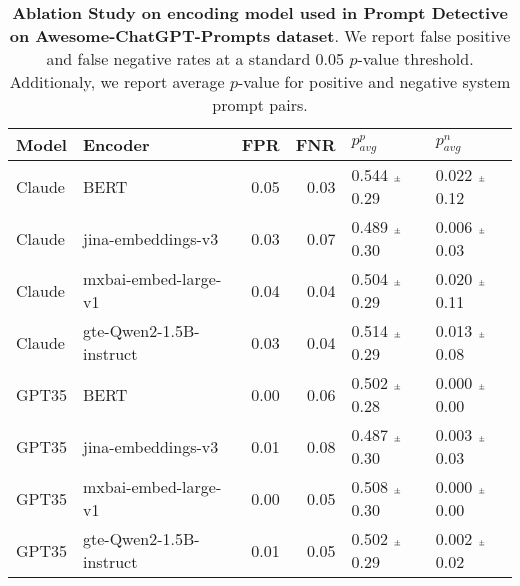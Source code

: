 \begin{table}[t!]
\caption{{\bf Ablation Study on encoding model used in Prompt Detective on Awesome-ChatGPT-Prompts dataset}. We report false positive and false negative rates at a standard 0.05 $p$-value threshold. Additionaly, we report average $p$-value for positive  and negative system prompt pairs.}
\label{tab: embeddings}
\centering
\setlength{\tabcolsep}{5pt}
\begin{tabular}{llrrll}
\toprule
Model & Encoder & FPR & FNR & $p_{avg}^{p}$ & $p_{avg}^{n}$ \\
\midrule
Claude & BERT & 0.05 & 0.03 & 0.544 $\scriptscriptstyle \pm \scriptstyle$ 0.29 & 0.022 $\scriptscriptstyle \pm \scriptstyle$ 0.12 \\
Claude & jina-embeddings-v3 & 0.03 & 0.07 & 0.489 $\scriptscriptstyle \pm \scriptstyle$ 0.30 & 0.006 $\scriptscriptstyle \pm \scriptstyle$ 0.03 \\
Claude & mxbai-embed-large-v1 & 0.04 & 0.04 & 0.504 $\scriptscriptstyle \pm \scriptstyle$ 0.29 & 0.020 $\scriptscriptstyle \pm \scriptstyle$ 0.11 \\
Claude & gte-Qwen2-1.5B-instruct & 0.03 & 0.04 & 0.514 $\scriptscriptstyle \pm \scriptstyle$ 0.29 & 0.013 $\scriptscriptstyle \pm \scriptstyle$ 0.08 \\
\midrule
GPT35 & BERT & 0.00 & 0.06 & 0.502 $\scriptscriptstyle \pm \scriptstyle$ 0.28 & 0.000 $\scriptscriptstyle \pm \scriptstyle$ 0.00 \\
GPT35 & jina-embeddings-v3 & 0.01 & 0.08 & 0.487 $\scriptscriptstyle \pm \scriptstyle$ 0.30 & 0.003 $\scriptscriptstyle \pm \scriptstyle$ 0.03 \\
GPT35 & mxbai-embed-large-v1 & 0.00 & 0.05 & 0.508 $\scriptscriptstyle \pm \scriptstyle$ 0.30 & 0.000 $\scriptscriptstyle \pm \scriptstyle$ 0.00 \\
GPT35 & gte-Qwen2-1.5B-instruct & 0.01 & 0.05 & 0.502 $\scriptscriptstyle \pm \scriptstyle$ 0.29 & 0.002 $\scriptscriptstyle \pm \scriptstyle$ 0.02 \\
\bottomrule
\end{tabular}
\end{table}